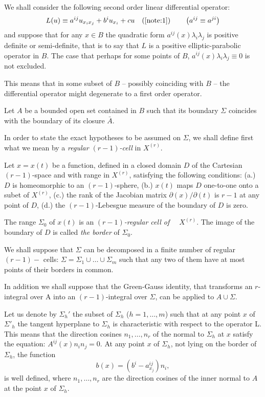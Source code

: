 \documentclass[a4paper,12pt,leqno]{article}
\numberwithin{equation}{section}
\begin{document}
We shall consider the following second order linear differential operator:
$$L(u) \equiv a^{i j} u_{x_{i} x_{j}}+b^{i} u_{x_{i}}+c u
\quad {}(\ref{note:1})
\quad\quad
\left(a^{ij} \equiv a^{ji}\right)$$
and suppose that for any $x \in B$ the quadratic form $a^{i j}(x) \lambda_{i} \lambda_{j}$ is positive definite or semi-definite, that is to say that $L$ is a positive elliptic-parabolic operator in $B$. 
The case that perhaps for some points of $B$, $a^{i j}(x) \lambda_{i} \lambda_{j} \equiv 0$ is not excluded.

This means that in some subset of $B$ -- possibly coinciding with $B$ -- the differential operator might degenerate to a first order operator.

Let $A$ be a bounded open set contained in $B$ such that its boundary $\Sigma$ coincides with the boundary of its closure $\bar{A}$.

In order to state the exact hypotheses to be assumed on $\Sigma$, we shall define first what we mean by a \emph{regular $(r-1)$-cell} in $X^{(r)}$.

Let $x=x(t)$ be a function, defined in a closed domain $D$ of the Cartesian $(r-1)$-space and with range in $X^{(r)}$, satisfying the following conditions: (a.) $D$ is homeomorphic to an $(r-1)$-sphere, (b.) $x(t)$ maps $D$ one-to-one onto a subet of $X^{(r)}$, (c.) the rank of the Jacobian matrix $\partial(x)/\partial(t)$ is $r-1$ at any point of $D$, (d.) the $(r-1)$-Lebesgue measure of the boundary of $D$ is zero. 

The range $\Sigma_{0}$ of $x(t)$ is an \emph{$(r-1)$-regular cell of $\quad X^{(r)}$}. 
The image of the boundary of $D$ is called \emph{the border} of $\Sigma_{0}$.

We shall suppose that $\Sigma$ can be decomposed in a finite number of regular $(r-1)-$ cells: $\Sigma=\Sigma_{1} \cup \ldots \cup \Sigma_{m}$ such that any two of them have at most points of their borders in common.

In addition we shall suppose that the Green-Gauss identity, that transforms an $r$-integral over A into an $(r-1)$-integral over $\Sigma$, can be applied to $A \cup \Sigma$.

Let us denote by $\Sigma_{h}'$ the subset of $\Sigma_{h} $ ($h=1, \ldots, m$) such that at any point $x$ of $\Sigma'_h$ the tangent hyperplane to $\Sigma_{h}$ is characteristic with respect to the operator L. This means that the direction cosines $n_{1}, \ldots, n_{r}$ of the normal to $\Sigma_{h}$ at $x$ satisfy the equation:
$A^{ij}(x) n_{i} n_{j}=0$. 
At any point $x$ of $\Sigma_{h}$, not lying on the border of $\Sigma_h$, the function
\begin{equation*}
	b(x)=\left(b^i-a_{x_{j}}^{i j}\right) n_i,
\end{equation*}
is well defined, where $n_{1}, \ldots, n_{r}$ are the direction cosines of the inner normal to $A$ at the point $x$ of $\Sigma_{h}$.
\end{document}

